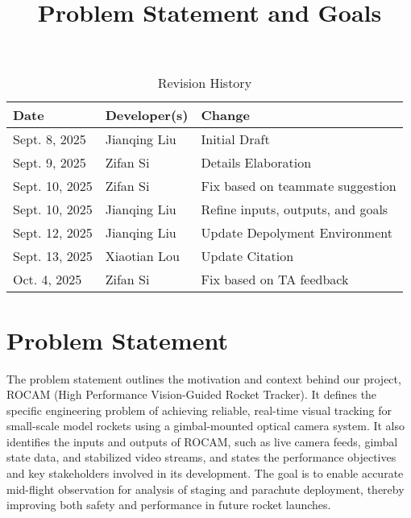 \documentclass{article}
\title{Problem Statement and Goals\\\progname}
\author{\authname}
\date{}
\begin{document}
\maketitle

\begin{table}[hp]
  \caption{Revision History} \label{TblRevisionHistory}
  \begin{tabularx}{\textwidth}{llX}
    \toprule
    \textbf{Date}  & \textbf{Developer(s)} & \textbf{Change}                   \\
    \midrule
    Sept. 8, 2025  & Jianqing Liu          & Initial Draft                     \\
    Sept. 9, 2025  & Zifan Si              & Details Elaboration               \\
    Sept. 10, 2025 & Zifan Si              & Fix based on teammate suggestion  \\
    Sept. 10, 2025 & Jianqing Liu          & Refine inputs, outputs, and goals \\
    Sept. 12, 2025 & Jianqing Liu          & Update Depolyment Environment     \\
    Sept. 13, 2025 & Xiaotian Lou          & Update Citation                   \\
    Oct.  4,  2025 & Zifan Si              & Fix based on TA feedback                   \\
    \bottomrule
  \end{tabularx}
\end{table}

\newpage{}

\section{Problem Statement}
The problem statement outlines the motivation and context behind our project, ROCAM
(High Performance Vision-Guided Rocket Tracker). It defines the specific
engineering problem of achieving reliable, real-time visual tracking for
small-scale model rockets using a gimbal-mounted optical camera system.
It also identifies the inputs and outputs of ROCAM, such as live camera
feeds, gimbal state data, and stabilized video streams, and states the
performance objectives and key stakeholders involved in its development.
The goal is to enable accurate mid-flight observation for analysis of
staging and parachute deployment, thereby improving both safety and
performance in future rocket launches.


\end{document}
